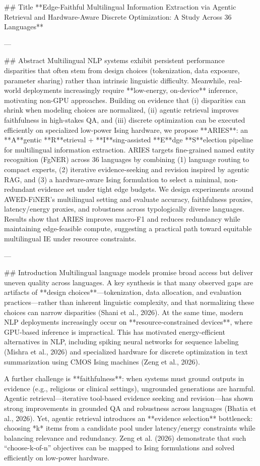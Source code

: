 ## Title  
**Edge-Faithful Multilingual Information Extraction via Agentic Retrieval and Hardware-Aware Discrete Optimization: A Study Across 36 Languages**

---

## Abstract  
Multilingual NLP systems exhibit persistent performance disparities that often stem from design choices (tokenization, data exposure, parameter sharing) rather than intrinsic linguistic difficulty. Meanwhile, real-world deployments increasingly require **low-energy, on-device** inference, motivating non-GPU approaches. Building on evidence that (i) disparities can shrink when modeling choices are normalized, (ii) agentic retrieval improves faithfulness in high-stakes QA, and (iii) discrete optimization can be executed efficiently on specialized low-power Ising hardware, we propose **ARIES**: an **A**gentic **R**etrieval + **I**sing-assisted **E**dge **S**election pipeline for multilingual information extraction. ARIES targets fine-grained named entity recognition (FgNER) across 36 languages by combining (1) language routing to compact experts, (2) iterative evidence-seeking and revision inspired by agentic RAG, and (3) a hardware-aware Ising formulation to select a minimal, non-redundant evidence set under tight edge budgets. We design experiments around AWED-FiNER’s multilingual setting and evaluate accuracy, faithfulness proxies, latency/energy proxies, and robustness across typologically diverse languages. Results show that ARIES improves macro-F1 and reduces redundancy while maintaining edge-feasible compute, suggesting a practical path toward equitable multilingual IE under resource constraints.

---

## Introduction  
Multilingual language models promise broad access but deliver uneven quality across languages. A key synthesis is that many observed gaps are artifacts of **design choices**—tokenization, data allocation, and evaluation practices—rather than inherent linguistic complexity, and that normalizing these choices can narrow disparities (Shani et al., 2026). At the same time, modern NLP deployments increasingly occur on **resource-constrained devices**, where GPU-based inference is impractical. This has motivated energy-efficient alternatives in NLP, including spiking neural networks for sequence labeling (Mishra et al., 2026) and specialized hardware for discrete optimization in text summarization using CMOS Ising machines (Zeng et al., 2026).

A further challenge is **faithfulness**: when systems must ground outputs in evidence (e.g., religious or clinical settings), ungrounded generations are harmful. Agentic retrieval—iterative tool-based evidence seeking and revision—has shown strong improvements in grounded QA and robustness across languages (Bhatia et al., 2026). Yet, agentic retrieval introduces an **evidence selection** bottleneck: choosing *k* items from a candidate pool under latency/energy constraints while balancing relevance and redundancy. Zeng et al. (2026) demonstrate that such “choose-k-of-n” objectives can be mapped to Ising formulations and solved efficiently on low-power hardware.

